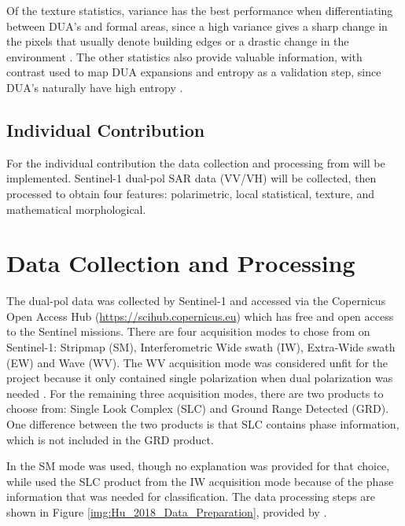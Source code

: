\documentclass[conference]{IEEEtran}
\begin{document}
		Of the texture statistics, variance has the best performance when differentiating between DUA's and formal areas, since a high variance gives a sharp change in the pixels that usually denote building edges or a drastic change in the environment \cite{Kuffer_2015}.
		The other statistics also provide valuable information, with contrast used to map DUA expansions and entropy as a validation step, since DUA's naturally have high entropy \cite{Kuffer_2016}.
		
	\subsection{Individual Contribution}
		For the individual contribution the data collection and processing from \cite{Hu_2018} will be implemented. 
		Sentinel-1 dual-pol SAR data (VV/VH) will be collected, then processed to obtain four features: polarimetric, local statistical, texture, and mathematical morphological. 


	\section{Data Collection and Processing}
	The dual-pol data was collected by Sentinel-1 and accessed via the Copernicus Open Access Hub (\url{https://scihub.copernicus.eu}) which has free and open access to the Sentinel missions.
	There are four acquisition modes to chose from on Sentinel-1: Stripmap (SM), Interferometric Wide swath (IW), Extra-Wide swath (EW) and Wave (WV).
	The WV acquisition mode was considered unfit for the project because it only contained single polarization when dual polarization was needed \cite{acq_modes}.
	For the remaining three acquisition modes, there are two products to choose from: Single Look Complex (SLC) and Ground Range Detected (GRD).
	One difference between the two products is that SLC contains phase information, which is not included in the GRD product.
	
	In \cite{Wurm_2017} the SM mode was used, though no explanation was provided for that choice, while \cite{Hu_2018} used the SLC product from the IW acquisition mode because of the phase information that was needed for classification. 
	The data processing steps are shown in Figure \ref{img:Hu_2018_Data_Preparation}, provided by \cite{Hu_2018}.
	
\end{document}
